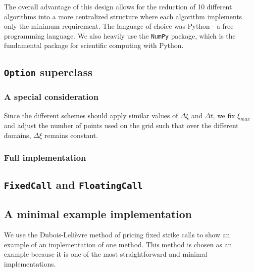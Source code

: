 \documentclass{article}
\begin{document}
The overall advantage of this design allows for the reduction of 10 different algorithms into a more centralized structure where each algorithm implements only the minimum requirement. The language of choice was Python - a free programming language. We also heavily use the \texttt{NumPy} package, which is the fundamental package for scientific computing with Python.

\subsection{\texttt{Option} superclass}

\subsubsection{A special consideration}
Since the different schemes should apply similar values of \(\Delta\xi\) and \(\Delta t\), we fix \(\xi_{max}\) and adjust the number of points used on the grid such that over the different domains, \(\Delta\xi\) remains constant.

\subsubsection{Full implementation}
\scriptsize

\normalsize

\subsection{\texttt{FixedCall} and \texttt{FloatingCall}}

\scriptsize

\normalsize

\scriptsize

\normalsize

\subsection{A minimal example implementation}

We use the Dubois-Leli\`{e}vre method of pricing fixed strike calls to show an example of an implementation of one method. This method is chosen as an example because it is one of the most straightforward and minimal implementations.
\scriptsize

\normalsize
\end{document}
